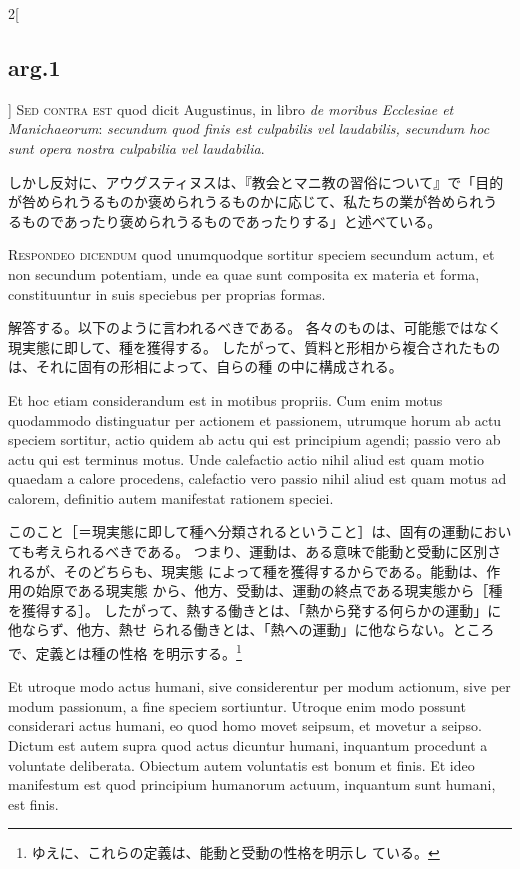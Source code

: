 \documentclass[paper=a4paper,fontsize=10pt,jafontsize=9pt,titlepage]{jlreq}
\begin{document}
\begin{paracol}{2}[\subsection{arg.1}]
{\scshape Sed contra est} quod dicit Augustinus, in
libro {\itshape de moribus Ecclesiae et Manichaeorum}: {\itshape secundum quod finis est
culpabilis vel laudabilis, secundum hoc sunt opera nostra culpabilia vel
laudabilia}.

\switchcolumn

しかし反対に、アウグスティヌスは、『教会とマニ教の習俗について』で「目的
 が咎められうるものか褒められうるものかに応じて、私たちの業が咎められう
 るものであったり褒められうるものであったりする」と述べている。


{\scshape Respondeo dicendum} quod unumquodque
sortitur speciem secundum actum, et non secundum potentiam, unde ea quae
sunt composita ex materia et forma, constituuntur in suis speciebus per
proprias formas.

\switchcolumn

解答する。以下のように言われるべきである。
各々のものは、可能態ではなく現実態に即して、種を獲得する。
したがって、質料と形相から複合されたものは、それに固有の形相によって、自らの種
 の中に構成される。

\switchcolumn*

Et hoc etiam considerandum est in motibus propriis. Cum
enim motus quodammodo distinguatur per actionem et passionem, utrumque
horum ab actu speciem sortitur, actio quidem ab actu qui est principium
agendi; passio vero ab actu qui est terminus motus. Unde calefactio
actio nihil aliud est quam motio quaedam a calore procedens, calefactio
vero passio nihil aliud est quam motus ad calorem, definitio autem
manifestat rationem speciei.

\switchcolumn

このこと［＝現実態に即して種へ分類されるということ］は、固有の運動におい
 ても考えられるべきである。
つまり、運動は、ある意味で能動と受動に区別されるが、そのどちらも、現実態
 によって種を獲得するからである。能動は、作用の始原である現実態
 から、他方、受動は、運動の終点である現実態から［種を獲得する］。
したがって、熱する働きとは、「熱から発する何らかの運動」に他ならず、他方、熱せ
 られる働きとは、「熱への運動」に他ならない。ところで、定義とは種の性格
 を明示する。\footnote{ゆえに、これらの定義は、能動と受動の性格を明示し
 ている。}

\switchcolumn*

Et utroque modo actus humani, sive
considerentur per modum actionum, sive per modum passionum, a fine
speciem sortiuntur. Utroque enim modo possunt considerari actus humani,
eo quod homo movet seipsum, et movetur a seipso. Dictum est autem supra
quod actus dicuntur humani, inquantum procedunt a voluntate
deliberata. Obiectum autem voluntatis est bonum et finis. Et ideo
manifestum est quod principium humanorum actuum, inquantum sunt humani,
est finis.


\end{paracol}
\end{document}

